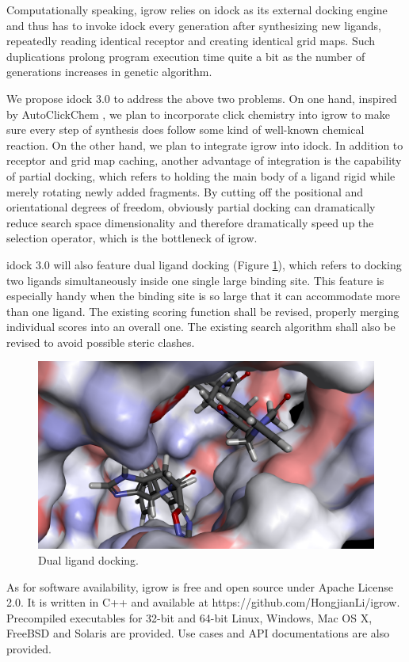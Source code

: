 Computationally speaking, igrow relies on idock as its external docking engine and thus has to invoke idock every generation after synthesizing new ligands, repeatedly reading identical receptor and creating identical grid maps. Such duplications prolong program execution time quite a bit as the number of generations increases in genetic algorithm.

We propose idock 3.0 to address the above two problems. On one hand, inspired by AutoClickChem \citep{1051}, we plan to incorporate click chemistry into igrow to make sure every step of synthesis does follow some kind of well-known chemical reaction. On the other hand, we plan to integrate igrow into idock. In addition to receptor and grid map caching, another advantage of integration is the capability of partial docking, which refers to holding the main body of a ligand rigid while merely rotating newly added fragments. By cutting off the positional and orientational degrees of freedom, obviously partial docking can dramatically reduce search space dimensionality and therefore dramatically speed up the selection operator, which is the bottleneck of igrow.

idock 3.0 will also feature dual ligand docking (Figure \ref{igrow:2IQHDualLigands}), which refers to docking two ligands simultaneously inside one single large binding site. This feature is especially handy when the binding site is so large that it can accommodate more than one ligand. The existing scoring function shall be revised, properly merging individual scores into an overall one. The existing search algorithm shall also be revised to avoid possible steric clashes.
 
\begin{figure}
\centering
\includegraphics[width=\textwidth]{igrow/2IQHDualLigands.png}
\caption{Dual ligand docking.}
\label{igrow:2IQHDualLigands}
\end{figure}

As for software availability, igrow is free and open source under Apache License 2.0. It is written in C++ and available at https://github.com/HongjianLi/igrow. Precompiled executables for 32-bit and 64-bit Linux, Windows, Mac OS X, FreeBSD and Solaris are provided. Use cases and API documentations are also provided.

\chapterend
